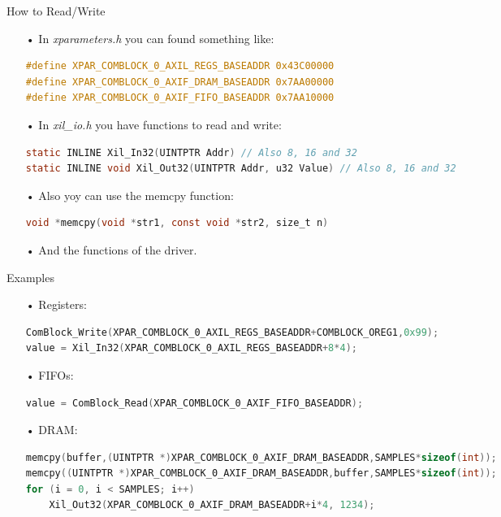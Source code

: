 \documentclass[11pt]{beamer}
\begin{document}
\begin{frame}[fragile]{How to Read/Write}
  \begin{itemize}
    \scriptsize
    \item[•] In \textit{xparameters.h} you can found something like:
      \begin{lstlisting}[language=C, numbers=none, basicstyle=\tiny]
#define XPAR_COMBLOCK_0_AXIL_REGS_BASEADDR 0x43C00000
#define XPAR_COMBLOCK_0_AXIF_DRAM_BASEADDR 0x7AA00000
#define XPAR_COMBLOCK_0_AXIF_FIFO_BASEADDR 0x7AA10000
      \end{lstlisting}
    \item[•] In \textit{xil\_io.h} you have functions to read and write:
      \begin{lstlisting}[language=C, numbers=none, basicstyle=\tiny]
static INLINE Xil_In32(UINTPTR Addr) // Also 8, 16 and 32
static INLINE void Xil_Out32(UINTPTR Addr, u32 Value) // Also 8, 16 and 32
      \end{lstlisting}
    \item[•] Also yoy can use the memcpy function:
      \begin{lstlisting}[language=C, numbers=none, basicstyle=\tiny]
void *memcpy(void *str1, const void *str2, size_t n)
      \end{lstlisting}
    \item[•] And the functions of the driver.
  \end{itemize}
\end{frame}

\begin{frame}[fragile]{Examples}
  \begin{itemize}
    \scriptsize
    \item[•] Registers:
      \begin{lstlisting}[language=C, numbers=none, basicstyle=\tiny]
ComBlock_Write(XPAR_COMBLOCK_0_AXIL_REGS_BASEADDR+COMBLOCK_OREG1,0x99);
value = Xil_In32(XPAR_COMBLOCK_0_AXIL_REGS_BASEADDR+8*4);
      \end{lstlisting}
    \item[•] FIFOs:
      \begin{lstlisting}[language=C, numbers=none, basicstyle=\tiny]
value = ComBlock_Read(XPAR_COMBLOCK_0_AXIF_FIFO_BASEADDR);
      \end{lstlisting}
    \item[•] DRAM:
      \begin{lstlisting}[language=C, numbers=none, basicstyle=\tiny]
memcpy(buffer,(UINTPTR *)XPAR_COMBLOCK_0_AXIF_DRAM_BASEADDR,SAMPLES*sizeof(int));
memcpy((UINTPTR *)XPAR_COMBLOCK_0_AXIF_DRAM_BASEADDR,buffer,SAMPLES*sizeof(int));
for (i = 0, i < SAMPLES; i++)
    Xil_Out32(XPAR_COMBLOCK_0_AXIF_DRAM_BASEADDR+i*4, 1234);
      \end{lstlisting}
  \end{itemize}
\end{frame}
\end{document}
